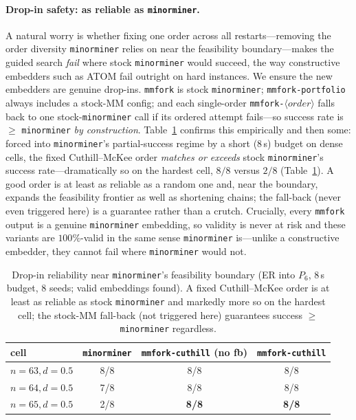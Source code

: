 \documentclass[acmsmall,anonymous,nonacm]{acmart}
\begin{document}
\paragraph{Drop-in safety: as reliable as \texttt{minorminer}.}
A natural worry is whether fixing one order across all restarts---removing the
order diversity \texttt{minorminer} relies on near the feasibility boundary---makes
the guided search \emph{fail} where stock \texttt{minorminer} would succeed, the
way constructive embedders such as ATOM fail outright on hard instances. We ensure
the new embedders are genuine drop-ins. \texttt{mmfork} is stock
\texttt{minorminer}; \texttt{mmfork-portfolio} always includes a stock-MM config;
and each single-order \texttt{mmfork-}$\langle\textit{order}\rangle$ falls back to
one stock-\texttt{minorminer} call if its ordered attempt fails---so success rate is
$\geq$ \texttt{minorminer} \emph{by construction}. Table~\ref{tab:success} confirms
this empirically and then some: forced into \texttt{minorminer}'s partial-success
regime by a short ($8$\,s) budget on dense cells, the fixed Cuthill--McKee order
\emph{matches or exceeds} stock \texttt{minorminer}'s success rate---dramatically so
on the hardest cell, $8/8$ versus $2/8$ (Table~\ref{tab:success}). A good order is
at least as reliable as a random one and, near the boundary, expands the
feasibility frontier as well as shortening chains; the fall-back (never even
triggered here) is a guarantee rather than a crutch. Crucially, every
\texttt{mmfork} output is a genuine \texttt{minorminer} embedding, so validity is
never at risk and these variants are $100\%$-valid in the same sense
\texttt{minorminer} is---unlike a constructive embedder, they cannot fail where
\texttt{minorminer} would not.

\begin{table}[t]
\caption{Drop-in reliability near \texttt{minorminer}'s feasibility boundary (ER
into $P_6$, $8$\,s budget, $8$ seeds; valid embeddings found). A fixed
Cuthill--McKee order is at least as reliable as stock \texttt{minorminer} and
markedly more so on the hardest cell; the stock-MM fall-back (not triggered here)
guarantees success $\geq$ \texttt{minorminer} regardless.}
\label{tab:success}
\small
\begin{tabular}{lccc}
\toprule
cell & \texttt{minorminer} & \texttt{mmfork-cuthill} (no fb) & \texttt{mmfork-cuthill} \\
\midrule
$n{=}63,d{=}0.5$ & 8/8 & 8/8 & 8/8 \\
$n{=}64,d{=}0.5$ & 7/8 & 8/8 & 8/8 \\
$n{=}65,d{=}0.5$ & 2/8 & \textbf{8/8} & \textbf{8/8} \\
\bottomrule
\end{tabular}
\end{table}
\end{document}
